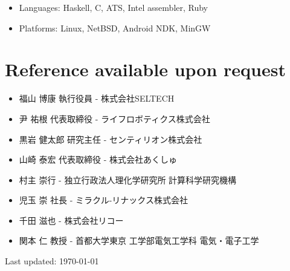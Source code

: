 \documentclass[letterpaper]{article}
\def\footer{
  \begin{center}
    \begin{footnotesize}
      Last updated: \today
    \end{footnotesize}
  \end{center}
}
\begin{document}
\begin{itemize}
  \item Languages: Haskell, C, ATS, Intel assembler, Ruby
  \item Platforms: Linux, NetBSD, Android NDK, MinGW
\end{itemize}

\section*{Reference available upon request}

\begin{itemize}
  \item 福山 博康 執行役員 - 株式会社SELTECH
  \item 尹 祐根 代表取締役 - ライフロボティクス株式会社
  \item 黒岩 健太郎 研究主任 - センティリオン株式会社
  \item 山崎 泰宏 代表取締役 - 株式会社あくしゅ
  \item 村主 崇行 - 独立行政法人理化学研究所 計算科学研究機構
  \item 児玉 崇 社長 - ミラクル-リナックス株式会社
  \item 千田 滋也 - 株式会社リコー
  \item 関本 仁 教授 - 首都大学東京 工学部電気工学科 電気・電子工学
\end{itemize}

\bigskip
\footer
\end{document}
